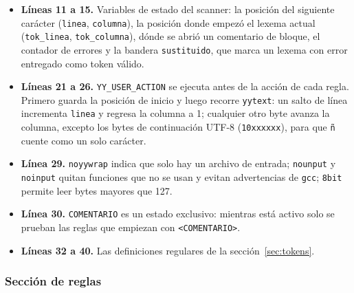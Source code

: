 \documentclass[12pt]{article}
\newcommand{\cmd}[1]{\texttt{\small #1}}
\begin{document}
\begin{itemize}[leftmargin=1.1cm,itemsep=0.25em]
\item \textbf{Líneas 11 a 15.} Variables de estado del scanner: la posición del siguiente
carácter (\cmd{linea}, \cmd{columna}), la posición donde empezó el lexema actual
(\cmd{tok\_linea}, \cmd{tok\_columna}), dónde se abrió un comentario de bloque, el contador de
errores y la bandera \cmd{sustituido}, que marca un lexema con error entregado como token válido.
\item \textbf{Líneas 21 a 26.} \cmd{YY\_USER\_ACTION} se ejecuta antes de la acción de cada
regla. Primero guarda la posición de inicio y luego recorre \cmd{yytext}: un salto de línea
incrementa \cmd{linea} y regresa la columna a 1; cualquier otro byte avanza la columna, excepto
los bytes de continuación UTF-8 (\cmd{10xxxxxx}), para que \cmd{ñ} cuente como un solo carácter.
\item \textbf{Línea 29.} \cmd{noyywrap} indica que solo hay un archivo de entrada;
\cmd{nounput} y \cmd{noinput} quitan funciones que no se usan y evitan advertencias de
\cmd{gcc}; \cmd{8bit} permite leer bytes mayores que 127.
\item \textbf{Línea 30.} \cmd{COMENTARIO} es un estado exclusivo: mientras está activo solo se
prueban las reglas que empiezan con \cmd{<COMENTARIO>}.
\item \textbf{Líneas 32 a 40.} Las definiciones regulares de la sección~\ref{sec:tokens}.
\end{itemize}

\subsubsection*{Sección de reglas}


\end{document}
